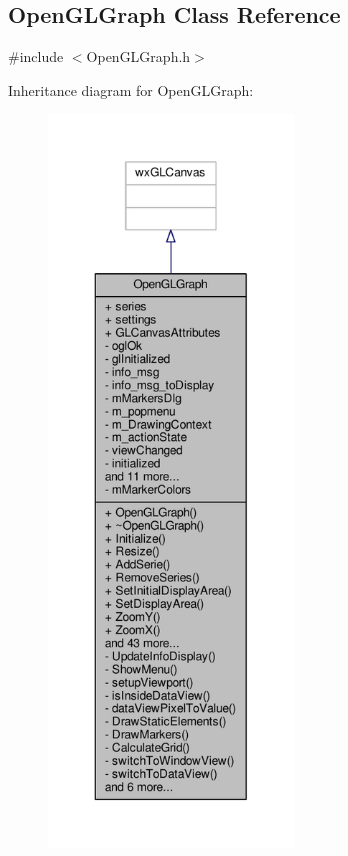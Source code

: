 \subsection{Open\+G\+L\+Graph Class Reference}
\label{classOpenGLGraph}


{\ttfamily \#include $<$Open\+G\+L\+Graph.\+h$>$}



Inheritance diagram for Open\+G\+L\+Graph\+:
\nopagebreak
\begin{figure}[H]
\begin{center}
\leavevmode
\includegraphics[height=550pt]{d0/d37/classOpenGLGraph__inherit__graph}
\end{center}
\end{figure}


